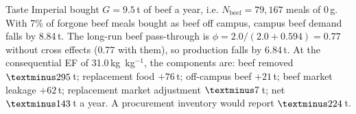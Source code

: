 Taste Imperial bought $G=9.5$\,t of beef a year, i.e. $N_{\mathrm{beef}}=79{,}167$ meals of 0\,g. With 7\% of forgone beef meals bought as beef off campus, campus beef demand falls by 8.84\,t. The long-run beef pass-through is $\phi = 2.0/(2.0+0.594) = 0.77$ without cross effects (0.77 with them), so production falls by 6.84\,t. At the consequential EF of 31.0\,kg \COtwoe\,kg$^{-1}$, the components are: beef removed $\textminus 295$\,t; replacement food $+76$\,t; off-campus beef $+21$\,t; beef market leakage $+62$\,t; replacement market adjustment $\textminus 7$\,t; net $\textminus 143$\,t \COtwoe{} a year. A procurement inventory would report $\textminus 224$\,t.
